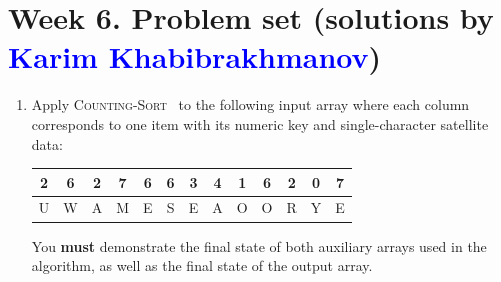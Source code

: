 \documentclass[dvipsnames]{article}
\begin{document}
\section*{Week 6. Problem set (solutions by \textcolor{blue}{Karim Khabibrakhmanov})}

\thispagestyle{fancy}

\begin{enumerate}

  \item Apply \textsc{Counting-Sort}~\cite[\S 8.2]{Cormen2022} to the following input array
    where each column corresponds to one item with its numeric key and single-character satellite data:
    \begin{center}
    \begin{tabular}{ |c|c|c|c|c|c|c|c|c|c|c|c|c| }
     \hline
     2 & 6 & 2 & 7 & 6 & 6 & 3 & 4 & 1 & 6 & 2 & 0 & 7  \\
     \hline
     U & W & A & M & E & S & E & A & O & O & R & Y & E \\
     \hline
    \end{tabular}
    \end{center}

    You \textbf{must} demonstrate the final state of both auxiliary arrays used in the algorithm,
    as well as the final state of the output array.


\end{enumerate}
\end{document}
